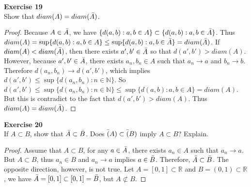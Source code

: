 \documentclass[12pt, a4paper]{article}
\theoremstyle{plain}
\newcommand{\N}{\mathbb{N}}
\newcommand{\R}{\mathbb{R}}
\newenvironment{exercise}[2][Exercise]
    { \begin{mdframed}[backgroundcolor=gray!20] \textbf{#1 #2} \\}
    {  \end{mdframed}}
\begin{document}
\begin{exercise}{19}
Show that $diam(A)=diam(\Bar{A})$.
\end{exercise}
    \begin{proof}
    Because $A\in\Bar{A}$, we have $\{d(a,b):a,b\in A\}\subset \{d(a,b):a,b\in\Bar{A}\}$. Thus $diam(A)=\sup\{d(a,b):a,b\in A\}\leq \sup\{d(a,b):a,b\in\Bar{A}\}=diam(\Bar{A})$. If $diam(A)<diam(\Bar{A})$, then there exists $a',b'\in\Bar{A}$ so that $d(a',b')>diam(A)$. However, because $a',b'\in \Bar{A}$, there exists $a_n,b_n\in A$ such that $a_n\rightarrow a$ and $b_n\rightarrow b$. Therefore $d(a_n,b_n)\rightarrow d(a',b')$, which implies $d(a',b')\leq \sup\{d(a_n,b_n):n\in\N\}$. So $d(a',b')\leq \sup\{d(a_n,b_n):n\in\N\}\leq \sup\{d(a,b):a,b\in A\}=diam(A)$. But this is contradict to the fact that $d(a',b')>diam(A)$. Thus $diam(A)=diam(\Bar{A})$.
    \end{proof}

\begin{exercise}{20}
If $A\subset B$, show that $\Bar{A}\subset \Bar{B}$. Does $\Bar(A)\subset \Bar(B)$ imply $A\subset B$? Explain.
\end{exercise}
    \begin{proof}
    Assume that $A\subset B$, for any $a\in\Bar{A}$, there exists $a_n\in A$ such that $a_n\rightarrow a$. But $A\subset B$, thus $a_n\in B$ and $a_n\rightarrow a$ implies $a\in\Bar{B}$. Therefore, $\Bar{A}\subset\Bar{B}$. The opposite direction, however, is not true. Let $A=[0,1]\subset \R$ and $B=(0,1)\subset \R$, we have $\Bar{A}=[0,1]\subset [0,1]=\Bar{B}$, but $A\not\subset B$.
    \end{proof}
\end{document}
